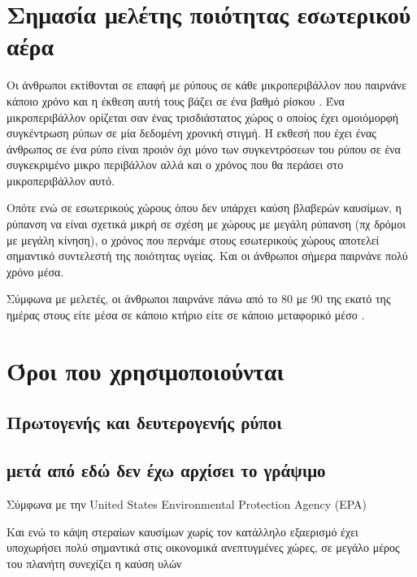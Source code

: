 \section{Σημασία μελέτης ποιότητας εσωτερικού αέρα}

Οι άνθρωποι εκτίθονται σε επαφή με ρύπους σε κάθε μικροπεριβάλλον που παιρνάνε κάποιο χρόνο και η έκθεση αυτή τους βάζει σε ένα βαθμό ρίσκου \cite{WHO(2021)}. Ένα μικροπεριβάλλον ορίζεται σαν ένας τρισδιάστατος χώρος ο οποίος έχει ομοιόμορφή συγκέντρωση ρύπων σε μία δεδομένη χρονική στιγμή. Η εκθεσή που έχει ένας άνθρωπος σε ένα ρύπο είναι προιόν όχι μόνο των συγκεντρόσεων του ρύπου σε ένα συγκεκριμένο μικρο περιβάλλον αλλά και ο χρόνος που θα περάσει στο μικροπεριβάλλον αυτό.

Οπότε ενώ σε εσωτερικούς χώρους όπου δεν υπάρχει καύση βλαβερών καυσίμων, η ρύπανση να είναι σχετικά μικρή σε σχέση με χώρους με μεγάλη ρύπανση (πχ δρόμοι με μεγάλη κίνηση), ο χρόνος που περνάμε στους εσωτερικούς χώρους αποτελεί σημαντικό συντελεστή της ποιότητας υγείας. Και οι άνθρωποι σήμερα παιρνάνε πολύ χρόνο μέσα.

Σύμφωνα με μελετές, %
οι άνθρωποι παιρνάνε πάνω από το 80 με 90 της εκατό της ημέρας στους είτε μέσα σε κάποιο κτήριο είτε σε κάποιο μεταφορικό μέσο .

\section{Όροι που χρησιμοποιούνται}

\subsection{Πρωτογενής και δευτερογενής ρύποι}

\subsection{μετά από εδώ δεν έχω αρχίσει το γράψιμο}

Σύμφωνα με την United States Environmental Protection Agency (EPA) \cite{EPA(1991)} 

Και ενώ το κάψη στεραίων καυσίμων χωρίς τον κατάλληλο εξαερισμό έχει υποχωρήσει πολύ σημαντικά στις οικονομικά ανεπτυγμένες χώρες, σε μεγάλο μέρος του πλανήτη συνεχίζει η καύση υλών 

